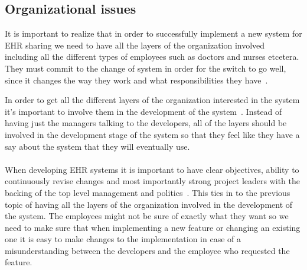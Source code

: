 \documentclass[14pt]{article}
\begin{document}
\subsection{Organizational issues}
It is important to realize that in order to successfully implement a new system for \gls{EHR} sharing we need to have all the layers of the organization involved~\cite{Empirica} including all the different types of employees such as doctors and nurses etcetera. They must commit to the change of system in order for the switch to go well, since it changes the way they work and what responsibilities they have~\cite{Empirica}.

 In order to get all the different layers of the organization interested in the system it's important to involve them in the development of the system~\cite{Empirica}. Instead of having just the managers talking to the developers, all of the layers should be involved in the development stage of the system so that they feel like they have a say about the system that they will eventually use.
\\\\
When developing \gls{EHR} systems it is important to have clear objectives, ability to continuously revise changes and most importantly strong project leaders with the backing of the top level management and politics~\cite{Empirica}. This ties in to the previous topic of having all the layers of the organization involved in the development of the system. The employees might not be sure of exactly what they want so we need to make sure that when implementing a new feature or changing an existing one it is easy to make changes to the implementation in case of a misunderstanding between the developers and the employee who requested the feature.
\end{document}
